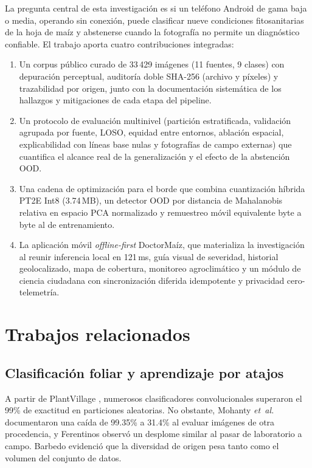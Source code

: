 \documentclass[conference,letterpaper]{IEEEtran}
\begin{document}
La pregunta central de esta investigación es si un teléfono Android de gama baja o media, operando sin conexión, puede clasificar nueve condiciones fitosanitarias de la hoja de maíz y abstenerse cuando la fotografía no permite un diagnóstico confiable. El trabajo aporta cuatro contribuciones integradas:
\begin{enumerate}
\item Un corpus público curado de 33\,429 imágenes (11 fuentes, 9 clases) con depuración perceptual, auditoría doble SHA-256 (archivo y píxeles) y trazabilidad por origen, junto con la documentación sistemática de los hallazgos y mitigaciones de cada etapa del pipeline.
\item Un protocolo de evaluación multinivel (partición estratificada, validación agrupada por fuente, LOSO, equidad entre entornos, ablación espacial, explicabilidad con líneas base nulas y fotografías de campo externas) que cuantifica el alcance real de la generalización y el efecto de la abstención OOD.
\item Una cadena de optimización para el borde que combina cuantización híbrida PT2E Int8 (3.74\,MB), un detector OOD por distancia de Mahalanobis relativa en espacio PCA normalizado y remuestreo móvil equivalente byte a byte al de entrenamiento.
\item La aplicación móvil \textit{offline-first} DoctorMaíz, que materializa la investigación al reunir inferencia local en 121\,ms, guía visual de severidad, historial geolocalizado, mapa de cobertura, monitoreo agroclimático y un módulo de ciencia ciudadana con sincronización diferida idempotente y privacidad cero-telemetría.
\end{enumerate}

\section{Trabajos relacionados}\label{sec:relacionados}

\subsection{Clasificación foliar y aprendizaje por atajos}
A partir de PlantVillage \cite{hughes2015}, numerosos clasificadores convolucionales superaron el 99\% de exactitud en particiones aleatorias. No obstante, Mohanty \textit{et~al.} \cite{mohanty2016} documentaron una caída de 99.35\% a 31.4\% al evaluar imágenes de otra procedencia, y Ferentinos \cite{ferentinos2018} observó un desplome similar al pasar de laboratorio a campo. Barbedo \cite{barbedo2018} evidenció que la diversidad de origen pesa tanto como el volumen del conjunto de datos.
\end{document}
